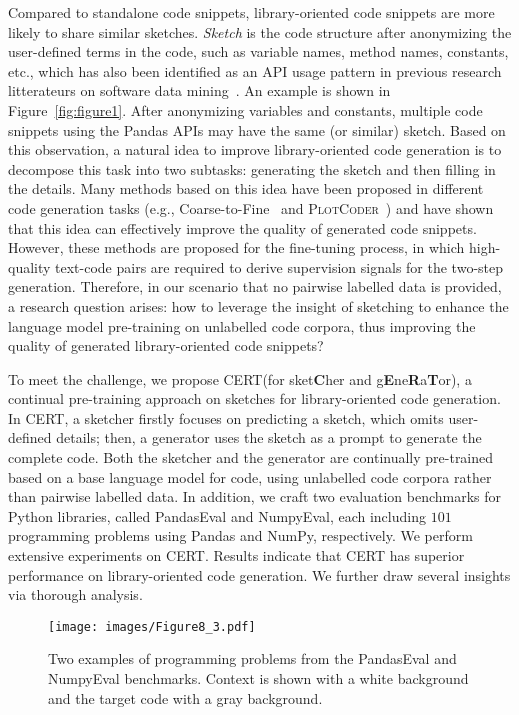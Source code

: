 \documentclass{article}
\newcommand{\cert}{\textsc{CERT}\xspace}
\newcommand{\peval}{PandasEval\xspace}
\newcommand{\neval}{NumpyEval\xspace}
\newcommand{\pandas}{Pandas\xspace}
\newcommand{\numpy}{NumPy\xspace}
\begin{document}
Compared to standalone code snippets, library-oriented code snippets are more likely to share similar sketches.
\emph{Sketch} is the code structure after anonymizing the user-defined terms in the code, such as variable names, method names, constants, etc., which has also been identified as an API usage pattern in previous research litterateurs on software data mining~\cite{ZhongECOOP2009,Wang2013-MSR,NIU2017127}.
An example is shown in Figure~\ref{fig:figure1}. After anonymizing variables and constants, multiple code snippets using the \pandas APIs may have the same (or similar) sketch.
Based on this observation, a natural idea to improve library-oriented code generation is to decompose this task into two subtasks: generating the sketch and then filling in the details.
Many methods based on this idea have been proposed in different code generation tasks (e.g., Coarse-to-Fine~\cite{dong2018coarse} and \textsc{PlotCoder}~\cite{chen2021plotcoder}) and have shown that this idea can effectively improve the quality of generated code snippets.
However, these methods are proposed for the fine-tuning process, in which high-quality text-code pairs are required to derive supervision signals for the two-step generation.
Therefore, in our scenario that no pairwise labelled data is provided, a research question arises: how to leverage the insight of sketching to enhance the language model pre-training on unlabelled code corpora, thus improving the quality of generated library-oriented code snippets?

To meet the challenge, we propose \cert (for sket\textbf{C}her and  g\textbf{E}ne\textbf{R}a\textbf{T}or), a continual pre-training approach on sketches for library-oriented code generation. In \cert, a sketcher firstly focuses on predicting a sketch, which omits user-defined details; then, a generator uses the sketch as a prompt to generate the complete code. Both the sketcher and the generator are continually pre-trained based on a base language model for code, using unlabelled code corpora rather than pairwise labelled data. In addition, we craft two evaluation benchmarks for Python libraries, called \peval and \neval,  each including $101$ programming problems using \pandas and \numpy, respectively. 
We perform extensive experiments on \cert. 
Results indicate that \cert has superior performance on library-oriented code generation.
We further draw several insights via thorough analysis. 

\begin{figure}[t] 
    \small
    \centering
    \texttt{[image: images/Figure8\_3.pdf]}
\caption{Two examples of programming problems from the \peval and \neval benchmarks. Context is shown with a white background and the target code with a gray background.}
    \label{fig:examples}
\end{figure}
\end{document}
